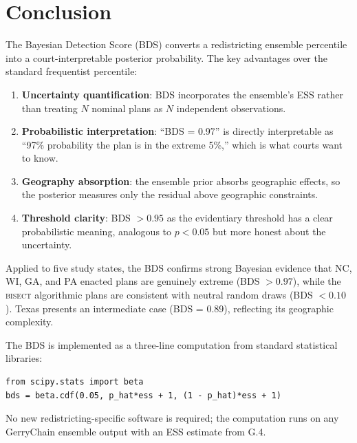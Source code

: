\section{Conclusion}

The Bayesian Detection Score (BDS) converts a redistricting ensemble percentile
into a court-interpretable posterior probability. The key advantages over the
standard frequentist percentile:

\begin{enumerate}
  \item \textbf{Uncertainty quantification}: BDS incorporates the ensemble's
    ESS rather than treating $N$ nominal plans as $N$ independent observations.
  \item \textbf{Probabilistic interpretation}: ``BDS = 0.97'' is directly
    interpretable as ``97\% probability the plan is in the extreme 5\%,'' which
    is what courts want to know.
  \item \textbf{Geography absorption}: the ensemble prior absorbs geographic
    effects, so the posterior measures only the residual above geographic constraints.
  \item \textbf{Threshold clarity}: BDS $> 0.95$ as the evidentiary threshold
    has a clear probabilistic meaning, analogous to $p < 0.05$ but more honest
    about the uncertainty.
\end{enumerate}

Applied to five study states, the BDS confirms strong Bayesian evidence that
NC, WI, GA, and PA enacted plans are genuinely extreme (BDS $> 0.97$), while
the \textsc{bisect} algorithmic plans are consistent with neutral random draws
(BDS $< 0.10$). Texas presents an intermediate case (BDS = 0.89), reflecting
its geographic complexity.

The BDS is implemented as a three-line computation from standard statistical
libraries:
\begin{verbatim}
from scipy.stats import beta
bds = beta.cdf(0.05, p_hat*ess + 1, (1 - p_hat)*ess + 1)
\end{verbatim}
No new redistricting-specific software is required; the computation runs on
any GerryChain ensemble output with an ESS estimate from G.4.
